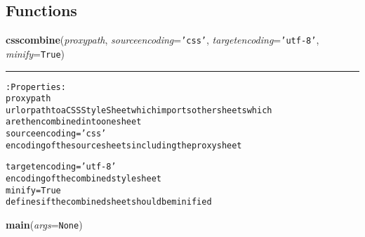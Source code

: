 
  \subsection{Functions}

    \label{cssutils:scripts:csscombine}

    \vspace{0.5ex}

\hspace{.8\funcindent}\begin{boxedminipage}{\funcwidth}

    \raggedright \textbf{csscombine}(\textit{proxypath}, \textit{sourceencoding}={\tt \texttt{'}\texttt{css}\texttt{'}}, \textit{targetencoding}={\tt \texttt{'}\texttt{utf-8}\texttt{'}}, \textit{minify}={\tt True})

    \vspace{-1.5ex}

    \rule{\textwidth}{0.5\fboxrule}
\setlength{\parskip}{2ex}
\begin{alltt}

:Properties:
    proxypath
        url or path to a CSSStyleSheet which imports other sheets which
        are then combined into one sheet
    sourceencoding = 'css'
        encoding of the source sheets including the proxy sheet
        
    targetencoding = 'utf-8'
        encoding of the combined stylesheet
    minify = True
        defines if the combined sheet should be minified
\end{alltt}

\setlength{\parskip}{1ex}
    \end{boxedminipage}

    \label{cssutils:scripts:csscombine':main}

    \vspace{0.5ex}

\hspace{.8\funcindent}\begin{boxedminipage}{\funcwidth}

    \raggedright \textbf{main}(\textit{args}={\tt None})

\setlength{\parskip}{2ex}
\setlength{\parskip}{1ex}
    \end{boxedminipage}

